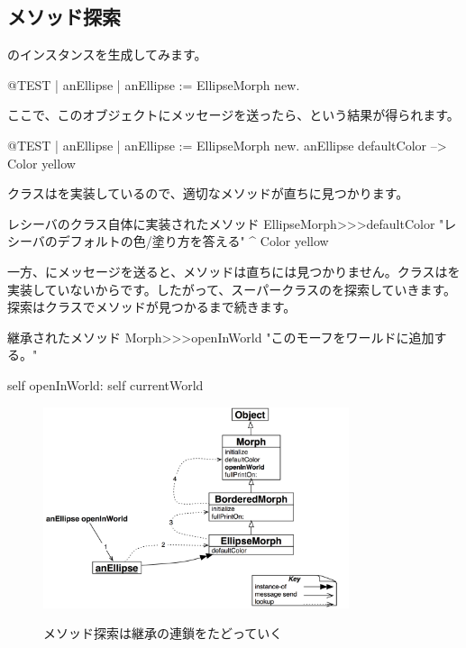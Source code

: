 \documentclass[a4paper,10pt,twoside]{book}
\begin{document}
\subsection{メソッド探索}
のインスタンスを生成してみます。
\begin{code}{@TEST | anEllipse |}
anEllipse := EllipseMorph new.
\end{code}
\noindent
ここで、このオブジェクトにメッセージを送ったら、という結果が得られます。
\begin{code}{@TEST | anEllipse | anEllipse := EllipseMorph new.}
anEllipse defaultColor --> Color yellow
\end{code}
\noindent
{}クラスはを実装しているので、適切なメソッドが直ちに見つかります。

\begin{method}[defaultColor]{レシーバのクラス自体に実装されたメソッド}
EllipseMorph>>>defaultColor
	"レシーバのデフォルトの色/塗り方を答える"
	^ Color yellow
\end{method}

一方、にメッセージを送ると、メソッドは直ちには見つかりません。クラスはを実装していないからです。したがって、スーパークラスのを探索していきます。探索はクラスでメソッドが見つかるまで続きます。

\begin{method}[openInWorld]{継承されたメソッド}
Morph>>>openInWorld
	"このモーフをワールドに追加する。"

	self openInWorld: self currentWorld
\end{method}

\begin{figure}[htb]
\begin{center}
	{\includegraphics[width=0.8\textwidth]{openInWorldLookup}}
\caption{メソッド探索は継承の連鎖をたどっていく}
\end{center}
\end{figure}
\end{document}
